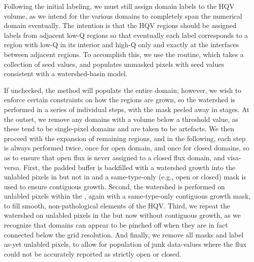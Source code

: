 \documentclass[10pt]{aastex62}
\begin{document}
\begin{itemize}
Following the initial labeling, we must still assign domain labels to the HQV volume, as we intend for the various domains to completely span the numerical domain eventually.
The intention is that the HQV regions should be assigned labels from adjacent low-Q regions so that eventually each label corresponds to a region with low-Q in its interior and high-Q only and exactly at the interfaces between adjacent regions.
To accomplish this, we use the  routine, which takes a collection of seed values, and populates unmasked pixels with seed values consistent with a watershed-basin model. 

If unchecked, the method will populate the entire domain; however, we wish to enforce certain constraints on how the regions are grown, so the watershed is performed in a series of individual steps, with the mask peeled away in stages.
At the outset, we remove any domains with a volume below a threshold value, as these tend to be single-pixel domains and are taken to be artefacts.
We then proceed with the expansion of remaining regions, and in the following, each step is always performed twice, once for open domain, and once for closed domains, so as to ensure that open flux is never assigned to a closed flux domain, and visa-versa. 
First, the padded buffer is backfilled with a watershed growth into the unlabled pixels in  but not in  and a same-type-only (e.g., open or closed) mask is used to ensure contiguous growth.
Second, the watershed is performed on unlabled pixels within the , again with a same-type-only contiguous growth mask, to fill smooth, non-pathological elements of the HQV. 
Third, we repeat the watershed on unlabled pixels in the  but now without contiguous growth, as we recognize that domains can appear to be pinched off when they are in fact connected below the grid resolution.
And finally, we remove all masks and label as-yet unlabled pixels, to allow for population of junk data-values where the flux could not be accurately reported as strictly open or closed.


\end{itemize}
\end{document}
